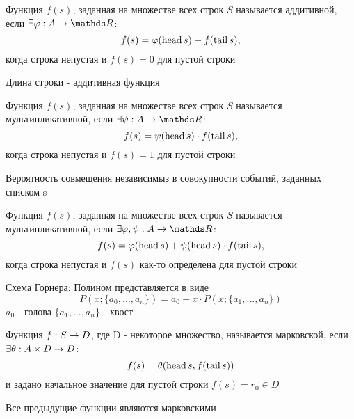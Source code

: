 \documentclass[discrete.tex]{subfiles}
\begin{document}
\begin{definition}
  Функция $f(s)$, заданная на множестве всех строк $S$ называется аддитивной, если $\e \varphi: A \ra \R$:
  \[f(s) = \varphi(\mathop{\rm head}\nolimits s) + f(\mathop{\rm tail}\nolimits s),\]
  когда строка непустая и $f(s) = 0$ для пустой строки
\end{definition}

\begin{example}
  Длина строки - аддитивная функция
\end{example}

\begin{definition}
  Функция $f(s)$, заданная на множестве всех строк $S$ называется мультипликативной, если $\e \psi: A \ra \R$:
  \[f(s) = \psi(\mathop{\rm head}\nolimits s) \cdot f(\mathop{\rm tail}\nolimits s),\]
  когда строка непустая и $f(s) = 1$ для пустой строки
\end{definition}

\begin{example}
  Вероятность совмещения независимыз в совокупности событий, заданных списком s
\end{example}

\begin{definition}
  Функция $f(s)$, заданная на множестве всех строк $S$ называется мультипликативной, если $\e \varphi, \psi: A \ra \R$:
  \[f(s) = \varphi(\mathop{\rm head}\nolimits s) + \psi(\mathop{\rm head}\nolimits s) \cdot f(\mathop{\rm tail}\nolimits s),\]
  когда строка непустая и $f(s)$ как-то определена для пустой строки
\end{definition}

\begin{example}
  Схема Горнера: Полином представляется в виде
  \[P(x;\{a_0,...,a_n\}) = a_0 + x \cdot P(x; \{a_1,...,a_n\})\]
  $a_0$ - голова $\{a_1,...,a_n\}$ - хвост
\end{example}

\begin{definition}
  Функция $f: S \rightarrow D$, где D - некоторое множество, называется марковской, если $\exists \theta: A \times D \rightarrow D$:
  \[f(s) = \theta(\mathop{\rm head}\nolimits s, f(\mathop{\rm tail}\nolimits s))\]
  и задано начальное значение для пустой строки $f(s) = r_0 \in D$
\end{definition}

\begin{remark}
  Все предыдущие функции являются марковскими
\end{remark}

\newpage
\end{document}
